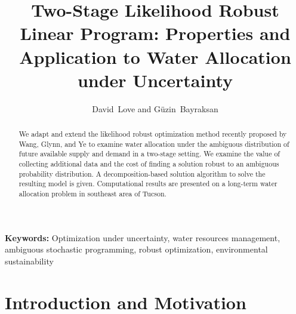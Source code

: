\documentclass[11pt]{article}
\author{David~Love and G\"{u}zin~Bayraksan}
\title{Two-Stage Likelihood Robust Linear Program: Properties and Application to Water Allocation under Uncertainty}
\date{}
\newcommand{\keywords}[1]{\par\noindent\enspace\ignorespaces\textbf{Keywords:} #1}
\begin{document}
\maketitle

\begin{abstract}
	We adapt and extend the likelihood robust optimization method recently proposed by Wang, Glynn, and Ye to examine water allocation under the ambiguous distribution of future available supply and demand in a two-stage setting.
	We examine the value of collecting additional data and the cost of finding a solution robust to an ambiguous probability distribution.
	A decomposition-based solution algorithm to solve the resulting model is given.
	Computational results are presented on a long-term water allocation problem in southeast area of Tucson.
\end{abstract}

\keywords{Optimization under uncertainty, water resources management,  ambiguous stochastic programming, robust optimization, environmental sustainability}

\section{Introduction and Motivation}

 
\end{document}
